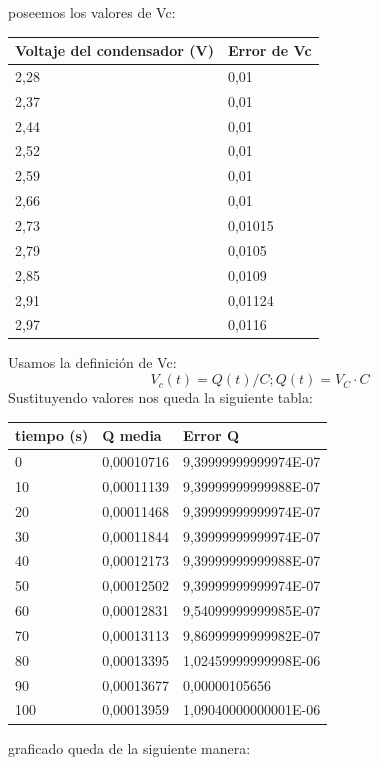 \documentclass{article}
\begin{document}
poseemos los valores de Vc:
\begin{table}[H]
    \centering
    \begin{tabular}{|l|l|}
    \hline
        Voltaje del condensador (V) & Error de Vc \\ \hline
        2,28 & 0,01 \\ \hline
        2,37 & 0,01 \\ \hline
        2,44 & 0,01 \\ \hline
        2,52 & 0,01 \\ \hline
        2,59 & 0,01 \\ \hline
        2,66 & 0,01 \\ \hline
        2,73 & 0,01015 \\ \hline
        2,79 & 0,0105 \\ \hline
        2,85 & 0,0109 \\ \hline
        2,91 & 0,01124 \\ \hline
        2,97 & 0,0116 \\ \hline
    \end{tabular}
\end{table}
Usamos la definición de Vc:
\begin{equation}
V_c(t)=Q(t)/C ; Q(t)=V_C\cdot C
\end{equation}
\newpage
Sustituyendo valores nos queda la siguiente tabla:
\begin{table}[H]
    \centering
    \begin{tabular}{|l|l|l|}
    \hline
        tiempo (s) & Q media & Error Q \\ \hline
        0 & 0,00010716 & 9,39999999999974E-07 \\ \hline
        10 & 0,00011139 & 9,39999999999988E-07 \\ \hline
        20 & 0,00011468 & 9,39999999999974E-07 \\ \hline
        30 & 0,00011844 & 9,39999999999974E-07 \\ \hline
        40 & 0,00012173 & 9,39999999999988E-07 \\ \hline
        50 & 0,00012502 & 9,39999999999974E-07 \\ \hline
        60 & 0,00012831 & 9,54099999999985E-07 \\ \hline
        70 & 0,00013113 & 9,86999999999982E-07 \\ \hline
        80 & 0,00013395 & 1,02459999999998E-06 \\ \hline
        90 & 0,00013677 & 0,00000105656 \\ \hline
        100 & 0,00013959 & 1,09040000000001E-06 \\ \hline
    \end{tabular}
\end{table}
graficado queda de la siguiente manera:
\end{document}
